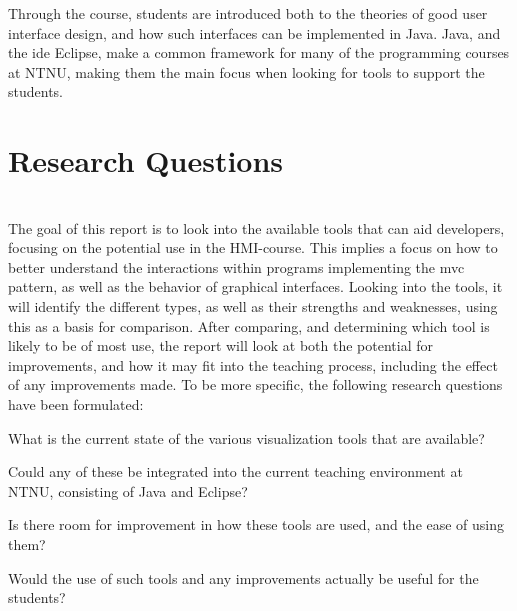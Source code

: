 Through the course, students are introduced both to the theories of good user interface design, and how such interfaces can be implemented in Java.
Java, and the \gls{ide} Eclipse, make a common framework for many of the programming courses at NTNU, making them the main focus when looking for tools to support the students.
~\\

\section{Research Questions}\label{intro-RQs}
~\\
The goal of this report is to look into the available tools that can aid developers, focusing on the potential use in the HMI-course.
This implies a focus on how to better understand the interactions within programs implementing the \gls{mvc} pattern, as well as the behavior of graphical interfaces.
Looking into the tools, it will identify the different types, as well as their strengths and weaknesses, using this as a basis for comparison.
After comparing, and determining which tool is likely to be of most use, the report will look at both the potential for improvements, and how it may fit into the teaching process, including the effect of any improvements made.
To be more specific, the following research questions have been formulated:
\begin{theorem}
What is the current state of the various visualization tools that are available?
\end{theorem}
\begin{theorem}
Could any of these be integrated into the current teaching environment at NTNU, consisting of Java and Eclipse? %
\end{theorem}
\begin{theorem}
Is there room for improvement in how these tools are used, and the ease of using them? %
\end{theorem}
\begin{theorem}
Would the use of such tools and any improvements actually be useful for the students?%
\end{theorem}
